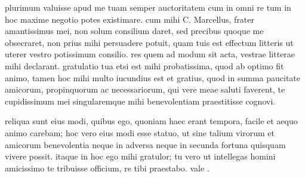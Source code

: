 


 plurimum valuisse apud me tuam semper auctoritatem cum in omni re tum in hoc maxime negotio potes existimare. cum mihi C. Marcellus, frater amantissimus mei, non solum consilium daret, sed precibus quoque me obsecraret, non prius mihi persuadere potuit, quam tuis est effectum litteris ut uterer vestro potissimum consilio. res quem ad modum sit acta, vestrae litterae mihi declarant. gratulatio tua etsi est mihi probatissima, quod ab optimo fit animo, tamen hoc mihi multo iucundius est et gratius, quod in summa paucitate amicorum, propinquorum ac necessariorum, qui vere meae saluti faverent, te cupidissimum mei singularemque mihi benevolentiam praestitisse cognovi.

 reliqua sunt eius modi, quibus ego, quoniam haec erant tempora, facile et aequo animo carebam; hoc vero eius modi esse statuo, ut sine talium virorum et amicorum benevolentia neque in adversa neque in secunda fortuna quisquam vivere possit. itaque in hoc ego mihi gratulor; tu vero ut intellegas homini amicissimo te tribuisse officium, re tibi praestabo. vale .
